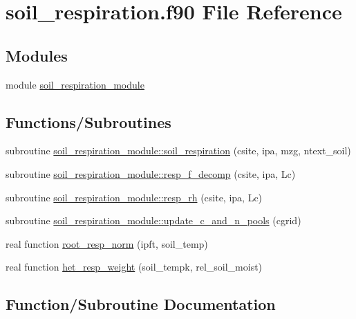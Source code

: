\hypertarget{soil__respiration_8f90}{}\section{soil\+\_\+respiration.\+f90 File Reference}
\label{soil__respiration_8f90}
\subsection*{Modules}
\begin{DoxyCompactItemize}
\item 
module \hyperlink{namespacesoil__respiration__module}{soil\+\_\+respiration\+\_\+module}
\end{DoxyCompactItemize}
\subsection*{Functions/\+Subroutines}
\begin{DoxyCompactItemize}
\item 
subroutine \hyperlink{namespacesoil__respiration__module_a7380496c7ed2fbb20775a028cbabce90}{soil\+\_\+respiration\+\_\+module\+::soil\+\_\+respiration} (csite, ipa, mzg, ntext\+\_\+soil)
\item 
subroutine \hyperlink{namespacesoil__respiration__module_ada75797dca345105ce23804891a18653}{soil\+\_\+respiration\+\_\+module\+::resp\+\_\+f\+\_\+decomp} (csite, ipa, Lc)
\item 
subroutine \hyperlink{namespacesoil__respiration__module_a8f5d4862e129f3374aa8d2ec68361afb}{soil\+\_\+respiration\+\_\+module\+::resp\+\_\+rh} (csite, ipa, Lc)
\item 
subroutine \hyperlink{namespacesoil__respiration__module_a2f7ba90950fb1d6060b4d3e13ccbeaed}{soil\+\_\+respiration\+\_\+module\+::update\+\_\+c\+\_\+and\+\_\+n\+\_\+pools} (cgrid)
\item 
real function \hyperlink{soil__respiration_8f90_a6a8296433a336a5b1c3a83f3e5f54fe6}{root\+\_\+resp\+\_\+norm} (ipft, soil\+\_\+temp)
\item 
real function \hyperlink{soil__respiration_8f90_ab250037d7a0906e7a92a88ba9ceac21a}{het\+\_\+resp\+\_\+weight} (soil\+\_\+tempk, rel\+\_\+soil\+\_\+moist)
\end{DoxyCompactItemize}


\subsection{Function/\+Subroutine Documentation}
\mbox{\label{soil__respiration_8f90_ab250037d7a0906e7a92a88ba9ceac21a}} 
